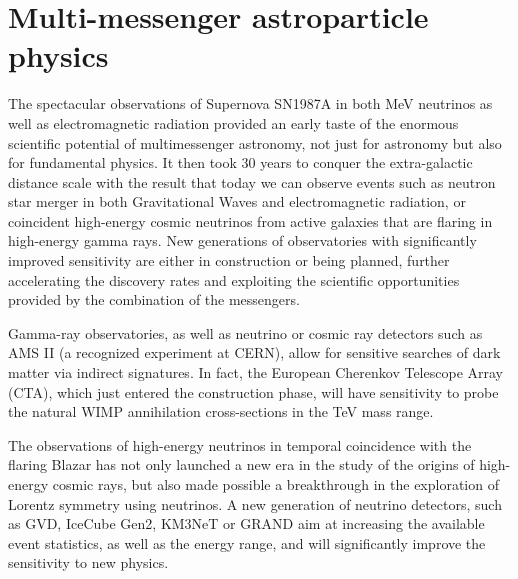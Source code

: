 \section{Multi-messenger astroparticle physics}
The spectacular observations of Supernova SN1987A in both MeV neutrinos as well as electromagnetic radiation provided an early taste of the enormous scientific potential of multimessenger astronomy, not just for astronomy but also for fundamental physics. It then took 30 years to conquer the extra-galactic distance scale with the result that  today we can observe events such as neutron star merger in both Gravitational Waves and electromagnetic radiation, or coincident high-energy cosmic neutrinos from active galaxies that are flaring in high-energy gamma rays. New generations of observatories with significantly improved sensitivity are either in construction or being planned,  further accelerating the discovery rates and exploiting the scientific opportunities provided by the combination of the messengers. 

Gamma-ray observatories, as well as neutrino or cosmic ray detectors such as AMS II (a recognized experiment at CERN), allow for sensitive searches of dark matter via  indirect signatures. In fact, the European Cherenkov Telescope Array (CTA), which just entered the construction phase, will have sensitivity to probe the natural WIMP annihilation cross-sections in the TeV mass range. 


The observations of high-energy neutrinos  in temporal coincidence with the flaring Blazar \cite{IceCube:2018dnn} has not
only launched a new era in the study of the origins of high-energy
cosmic rays, but also made possible a breakthrough in the exploration
of Lorentz symmetry using neutrinos. A new generation of neutrino detectors, such as GVD, IceCube Gen2, KM3NeT or GRAND aim at increasing the available event statistics, as well as the energy range, and  will significantly improve the sensitivity to new physics.
\vspace*{-2mm}
 

